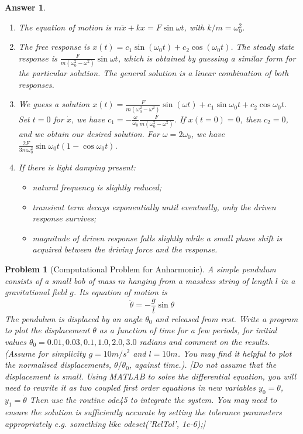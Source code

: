 \documentclass[a4paper]{article}
\newtheorem{ans}{Answer}[section]
\theoremstyle{new}
\newtheorem{qns}{Problem}[section]
\begin{document}
\begin{ans}\leavevmode
\begin{enumerate}[label=(\alph*)]
\item The equation of motion is $m\ddot{x}+kx=F\sin\omega t$, with $k/m=\omega_0^2$.
\item The free response is $x(t)=c_1\sin(\omega_0t)+c_2\cos(\omega_0t)$. The steady state response is $\frac{F}{m(\omega_0^2-\omega^2)}\sin\omega t$, which is obtained by guessing a similar form for the particular solution. The general solution is a linear combination of both responses.
\item We guess a solution $x(t)=\frac{F}{m(\omega_0^2-\omega^2)}\sin(\omega t)+c_1\sin\omega_0t+c_2\cos\omega_0t$. Set $t=0$ for $\dot{x}$, we have $c_1=-\frac{\omega}{\omega_0}\frac{F}{m(\omega_0^2-\omega^2)}$. If $x(t=0)=0$, then $c_2=0$, and we obtain our desired solution. For $\omega=2\omega_0$, we have $\frac{2F}{3m\omega_0^2}\sin\omega_0t(1-\cos\omega_0t)$.
\begin{center}
\end{center}
\item If there is light damping present:
\begin{itemize}
    \item natural frequency is slightly reduced;
    \item transient term decays exponentially until eventually, only the driven response survives;
    \item magnitude of driven response falls slightly while a small phase shift is acquired between the driving force and the response.
\end{itemize}
\end{enumerate}
\end{ans}
\newpage
\begin{qns}[Computational Problem for Anharmonic]
A simple pendulum consists of a small bob of mass $m$ hanging
from a massless string of length $l$ in a gravitational field $g$. Its equation of motion is
$$\ddot{\theta}=-\frac{g}{l}\sin\theta$$
The pendulum is displaced by an angle $\theta_0$ and released from rest. Write a program to plot the displacement $\theta$ as a function of time for a few periods, for initial values $\theta_0=0.01, 0.03,0.1,1.0,2.0,3.0$ radians and comment on the results. (Assume for simplicity $g=10m/s^2$ and $l = 10m$. You may find it helpful to plot the normalised displacements, $\theta/\theta_0$, against time.). [Do not assume that the displacement is small. Using MATLAB to solve the differential equation, you
will need to rewrite it as two coupled first order equations in new variables $y_0=\theta$, $y_1=\dot{\theta}$ Then
use the routine ode45 to integrate the system. You may need to ensure the solution is sufficiently
accurate by setting the tolerance parameters appropriately e.g. something like odeset(’RelTol’,
1e-6);]
\end{qns}
\end{document}
